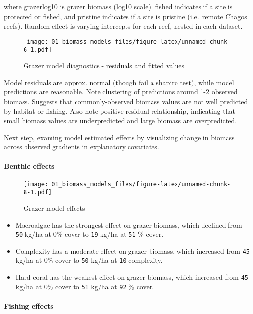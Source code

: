 \documentclass[]{article}
\let\oldparagraph\paragraph
\renewcommand{\paragraph}[1]{\oldparagraph{#1}\mbox{}}
\begin{document}
where grazerlog10 is grazer biomass (log10 scale), fished indicates if a
site is protected or fished, and pristine indicates if a site is
pristine (i.e.~remote Chagos reefs). Random effect is varying intercepts
for each reef, nested in each dataset.

\begin{figure}
\centering
\texttt{[image: 01\_biomass\_models\_files/figure-latex/unnamed-chunk-6-1.pdf]}
\caption{Grazer model diagnostics - residuals and fitted values}
\end{figure}

Model residuals are approx. normal (though fail a shapiro test), while
model predictions are reasonable. Note clustering of predictions around
1-2 observed biomass. Suggests that commonly-observed biomass values are
not well predicted by habitat or fishing. Also note positive residual
relationship, indicating that small biomass values are underpredicted
and large biomass are overpredicted.

Next step, examing model estimated effects by visualizing change in
biomass across observed gradients in explanatory covariates.

\newpage

\paragraph{Benthic effects}\label{benthic-effects}

\begin{figure}
\centering
\texttt{[image: 01\_biomass\_models\_files/figure-latex/unnamed-chunk-8-1.pdf]}
\caption{Grazer model effects}
\end{figure}

\begin{itemize}
\item
  Macroalgae has the strongest effect on grazer biomass, which declined
  from \texttt{50} kg/ha at 0\% cover to \texttt{19} kg/ha at
  \texttt{51} \% cover.
\item
  Complexity has a moderate effect on grazer biomass, which increased
  from \texttt{45} kg/ha at 0\% cover to \texttt{50} kg/ha at
  \texttt{10} complexity.
\item
  Hard coral has the weakest effect on grazer biomass, which increased
  from \texttt{45} kg/ha at 0\% cover to \texttt{51} kg/ha at
  \texttt{92} \% cover.
\end{itemize}

\newpage

\paragraph{Fishing effects}\label{fishing-effects}
\end{document}
